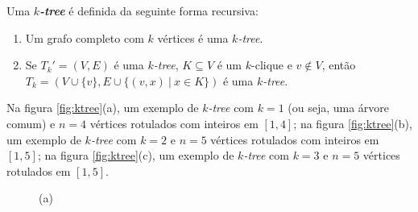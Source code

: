 \begin{definition}
  \label{def:ktree}
  \cite{harary} Uma \textbf{\emph{$k$-tree}} é definida da seguinte forma recursiva:

  \begin{enumerate}
    \item Um grafo completo com $k$ vértices é uma \emph{$k$-tree}.
    \item Se $T_k' = (V, E)$ é uma \emph{$k$-tree}, $K \subseteq V$ é um $k$-clique e $v \not \in V$, então $T_k = (V \cup \{v\}, E \cup \{(v,x) \ | \  x \in K\})$ é uma \emph{$k$-tree}.
  \end{enumerate}

  Na figura \ref{fig:ktree}(a), um exemplo de \emph{$k$-tree} com $k = 1$ (ou seja, uma árvore comum) e $n = 4$ vértices rotulados com inteiros em $[1, 4]$; na figura \ref{fig:ktree}(b), um exemplo de \emph{$k$-tree} com $k = 2$ e $n = 5$ vértices rotulados com inteiros em $[1, 5]$; na figura \ref{fig:ktree}(c), um exemplo de \emph{$k$-tree} com $k = 3$ e $n = 5$ vértices rotulados em $[1, 5]$.

  \begin{figure}
    \begin{minipage}{0.3333\textwidth}
      \centering

      (a)
    \end{minipage}\begin{minipage}{0.3333\textwidth}
      \centering


\end{minipage}
\end{figure}
\end{definition}
